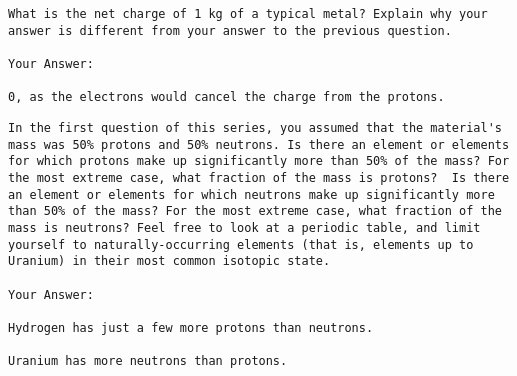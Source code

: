 \documentclass[letterpaper]{article}
\begin{document}
\begin{verbatim}
What is the net charge of 1 kg of a typical metal? Explain why your answer is different from your answer to the previous question. 

Your Answer:

0, as the electrons would cancel the charge from the protons.
\end{verbatim}

\begin{verbatim}
In the first question of this series, you assumed that the material's mass was 50% protons and 50% neutrons. Is there an element or elements for which protons make up significantly more than 50% of the mass? For the most extreme case, what fraction of the mass is protons?  Is there an element or elements for which neutrons make up significantly more than 50% of the mass? For the most extreme case, what fraction of the mass is neutrons? Feel free to look at a periodic table, and limit yourself to naturally-occurring elements (that is, elements up to Uranium) in their most common isotopic state.

Your Answer:

Hydrogen has just a few more protons than neutrons.

Uranium has more neutrons than protons.
\end{verbatim}
\end{document}
